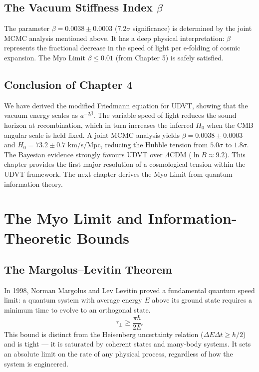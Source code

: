 \documentclass[12pt,a4paper]{book}
\theoremstyle{definition}
\theoremstyle{remark}
\begin{document}
\section{The Vacuum Stiffness Index $\beta$}

The parameter $\beta = 0.0038 \pm 0.0003$ ($7.2\sigma$ significance) is determined by the joint MCMC analysis mentioned above. It has a deep physical interpretation: $\beta$ represents the fractional decrease in the speed of light per e-folding of cosmic expansion. The Myo Limit $\beta \leq 0.01$ (from Chapter 5) is safely satisfied.

\section{Conclusion of Chapter 4}

We have derived the modified Friedmann equation for UDVT, showing that the vacuum energy scales as $a^{-2\beta}$. The variable speed of light reduces the sound horizon at recombination, which in turn increases the inferred $H_0$ when the CMB angular scale is held fixed. A joint MCMC analysis yields $\beta = 0.0038 \pm 0.0003$ and $H_0 = 73.2 \pm 0.7$ km/s/Mpc, reducing the Hubble tension from $5.0\sigma$ to $1.8\sigma$. The Bayesian evidence strongly favours UDVT over $\Lambda$CDM ($\ln B \approx 9.2$). This chapter provides the first major resolution of a cosmological tension within the UDVT framework. The next chapter derives the Myo Limit from quantum information theory.

\chapter{The Myo Limit and Information-Theoretic Bounds}
\label{ch:myo}

\section{The Margolus--Levitin Theorem}

In 1998, Norman Margolus and Lev Levitin proved a fundamental quantum speed limit: a quantum system with average energy $E$ above its ground state requires a minimum time to evolve to an orthogonal state.
\begin{equation}
    \tau_{\perp} \geq \frac{\pi\hbar}{2E}.
\end{equation}
This bound is distinct from the Heisenberg uncertainty relation ($\Delta E \Delta t \geq \hbar/2$) and is tight --- it is saturated by coherent states and many-body systems. It sets an absolute limit on the rate of any physical process, regardless of how the system is engineered.
\end{document}
